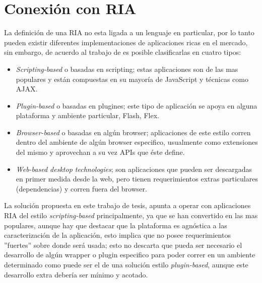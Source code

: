 \section{Conexión con RIA} \label{sec:extension_ria_conexion}

La definición de una RIA no esta ligada a un lenguaje en particular, por lo tanto pueden existir diferentes implementaciones de aplicaciones ricas en el mercado, sin embargo, de acuerdo al trabajo de \citet{Bozzon2006} es posible clasificarlas en cuatro tipos:
\begin{itemize}
\item \emph{Scripting-based} o basadas en scripting; estas aplicaciones son de las mas populares y están compuestas en su mayoría de JavaScript y técnicas como AJAX.
\item \emph{Plugin-based} o basadas en plugines; este tipo de aplicación se apoya en alguna plataforma y ambiente particular, \eg Flash, Flex. 
\item \emph{Browser-based} o basadas en algún browser; aplicaciones de este estilo corren dentro del ambiente de algún browser especifico, usualmente como extensiones del mismo y aprovechan a su vez APIs que éste define.
\item \emph{Web-based desktop technologies}; son aplicaciones que pueden ser descargadas en primer medida desde la web, pero tienen requerimientos extras particulares (\ie dependencias) y corren fuera del browser.
\end{itemize}
La solución propuesta en este trabajo de tesis, apunta a operar con aplicaciones RIA del estilo \emph{scripting-based} principalmente, ya que se han convertido en las mas populares, aunque hay que destacar que la plataforma es agnóstica a las caracterización de la aplicación, esto implica que no posee requerimientos ''fuertes'' sobre donde será usada; esto no descarta que pueda ser necesario el desarrollo de algún wrapper o plugin especifico para poder correr en un ambiente determinado como puede ser el de una solución estilo \emph{plugin-based}, aunque este desarrollo extra debería ser mínimo y acotado.

